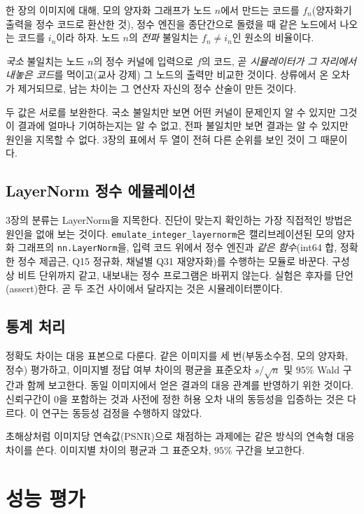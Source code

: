 \documentclass[11pt,a4paper,oneside]{report}
\begin{document}
한 장의 이미지에 대해, 모의 양자화 그래프가 노드 $n$에서 만드는 코드를 $f_n$(양자화기 출력을 정수 코드로
환산한 것), 정수 엔진을 종단간으로 돌렸을 때 같은 노드에서 나오는 코드를 $i_n$이라 하자. 노드 $n$의
\emph{전파} 불일치는 $f_n \neq i_n$인 원소의 비율이다.

\emph{국소} 불일치는 노드 $n$의 정수 커널에 입력으로 $f$의 코드, 곧 \emph{시뮬레이터가 그 자리에서 내놓은
코드}를 먹이고(교사 강제) 그 노드의 출력만 비교한 것이다. 상류에서 온 오차가 제거되므로, 남는 차이는 그
연산자 자신의 정수 산술이 만든 것이다.

두 값은 서로를 보완한다. 국소 불일치만 보면 어떤 커널이 문제인지 알 수 있지만 그것이 결과에 얼마나
기여하는지는 알 수 없고, 전파 불일치만 보면 결과는 알 수 있지만 원인을 지목할 수 없다. 3장의 표에서 두 열이
전혀 다른 순위를 보인 것이 그 때문이다.

\section{LayerNorm 정수 에뮬레이션}

3장의 분류는 LayerNorm을 지목한다. 진단이 맞는지 확인하는 가장 직접적인 방법은 원인을 없애 보는 것이다.
\texttt{emulate\_integer\_layernorm}은 캘리브레이션된 모의 양자화 그래프의 \texttt{nn.LayerNorm}을, 입력
코드 위에서 정수 엔진과 \emph{같은 함수}(int64 합, 정확한 정수 제곱근, Q15 정규화, 채널별 Q31 재양자화)를
수행하는 모듈로 바꾼다. 구성상 비트 단위까지 같고, 내보내는 정수 프로그램은 바뀌지 않는다. 실험은 후자를
단언(assert)한다. 곧 두 조건 사이에서 달라지는 것은 시뮬레이터뿐이다.

\section{통계 처리}

정확도 차이는 대응 표본으로 다룬다. 같은 이미지를 세 번(부동소수점, 모의 양자화, 정수) 평가하고, 이미지별
정답 여부 차이의 평균을 표준오차 $s/\sqrt{n}$ 및 $95\%$ Wald 구간과 함께 보고한다.
동일 이미지에서 얻은 결과의 대응 관계를 반영하기 위한 것이다. 신뢰구간이 0을 포함하는 것과
사전에 정한 허용 오차 내의 동등성을 입증하는 것은 다르다. 이 연구는 동등성 검정을 수행하지 않았다.

초해상처럼 이미지당 연속값(PSNR)으로 채점하는 과제에는 같은 방식의 연속형 대응 차이를 쓴다. 이미지별
차이의 평균과 그 표준오차, $95\%$ 구간을 보고한다.

\chapter{성능 평가}
\end{document}
